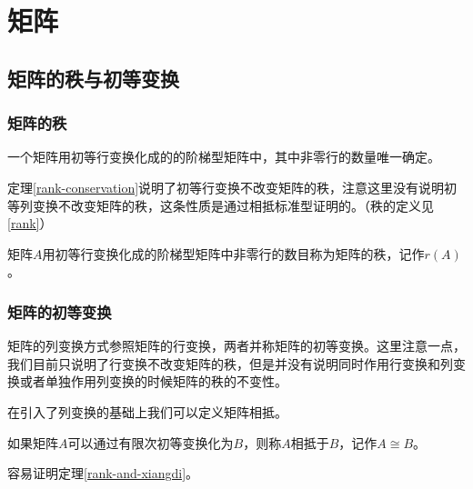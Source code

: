\chapter{矩阵}

\section{矩阵的秩与初等变换}

\subsection{矩阵的秩}

\begin{thm}
    \label{rank-conservation}
    一个矩阵用初等行变换化成的的阶梯型矩阵中，其中非零行的数量唯一确定。
\end{thm}

定理\ref{rank-conservation}说明了初等行变换不改变矩阵的秩，注意这里没有说明初等列变换不改变矩阵的秩，这条性质是通过相抵标准型证明的。（秩的定义见\ref{rank}）

\begin{definition}
    \label{rank}
    矩阵$A$用初等行变换化成的阶梯型矩阵中非零行的数目称为矩阵的秩，记作$r(A)$。
\end{definition}

\subsection{矩阵的初等变换}

矩阵的列变换方式参照矩阵的行变换，两者并称矩阵的初等变换。这里注意一点，我们目前只说明了行变换不改变矩阵的秩，但是并没有说明同时作用行变换和列变换或者单独作用列变换的时候矩阵的秩的不变性。

在引入了列变换的基础上我们可以定义矩阵相抵。

\begin{definition}
    \label{xiangdi} %
    如果矩阵$A$可以通过有限次初等变换化为$B$，则称$A$相抵于$B$，记作$A\cong B$。
\end{definition}

容易证明定理\ref{rank-and-xiangdi}。

